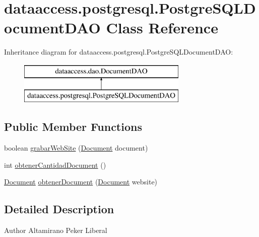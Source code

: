 \hypertarget{classdataaccess_1_1postgresql_1_1_postgre_s_q_l_document_d_a_o}{\section{dataaccess.\-postgresql.\-Postgre\-S\-Q\-L\-Document\-D\-A\-O \-Class \-Reference}
\label{classdataaccess_1_1postgresql_1_1_postgre_s_q_l_document_d_a_o}
}
\-Inheritance diagram for dataaccess.\-postgresql.\-Postgre\-S\-Q\-L\-Document\-D\-A\-O\-:\begin{figure}[H]
\begin{center}
\leavevmode
\includegraphics[height=2.000000cm]{classdataaccess_1_1postgresql_1_1_postgre_s_q_l_document_d_a_o}
\end{center}
\end{figure}
\subsection*{\-Public \-Member \-Functions}
\begin{DoxyCompactItemize}
\item 
boolean \hyperlink{classdataaccess_1_1postgresql_1_1_postgre_s_q_l_document_d_a_o_acaaa543e7323f3e2a575c77f5c665064}{grabar\-Web\-Site} (\hyperlink{classcom_1_1utn_1_1searchengine_1_1_document}{\-Document} document)
\item 
int \hyperlink{classdataaccess_1_1postgresql_1_1_postgre_s_q_l_document_d_a_o_aff57f39a2beb558bbd14fe73c92447d5}{obtener\-Cantidad\-Document} ()
\item 
\hyperlink{classcom_1_1utn_1_1searchengine_1_1_document}{\-Document} \hyperlink{classdataaccess_1_1postgresql_1_1_postgre_s_q_l_document_d_a_o_a8129984712142f8220304815ff2c2a19}{obtener\-Document} (\hyperlink{classcom_1_1utn_1_1searchengine_1_1_document}{\-Document} website)
\end{DoxyCompactItemize}


\subsection{\-Detailed \-Description}
\begin{DoxyAuthor}{\-Author}
\-Altamirano \-Peker \-Liberal 
\end{DoxyAuthor}


